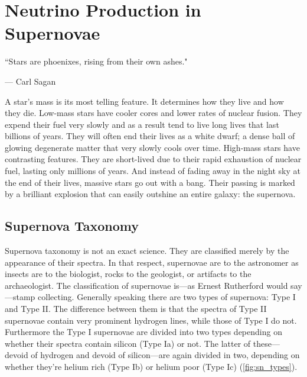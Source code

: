 %
%
%
%


\chapter{Neutrino Production in Supernovae}
	\label{supernovae_chapter}

	\vspace{-0.2in}

	\begin{quoting}
		\noindent \large ``Stars are phoenixes, rising from their own ashes." \normalsize

		--- Carl Sagan
	\end{quoting}

	 A star's mass is its most telling feature. It determines how they live and how they die. Low-mass stars have cooler cores and lower rates of nuclear fusion. They expend their fuel very slowly and as a result tend to live long lives that last billions of years. They will often end their lives as a white dwarf; a dense ball of glowing degenerate matter that very slowly cools over time. High-mass stars have contrasting features. They are short-lived due to their rapid exhaustion of nuclear fuel, lasting only millions of years. And instead of fading away in the night sky at the end of their lives, massive stars go out with a bang. Their passing is marked by a brilliant explosion that can easily outshine an entire galaxy: the supernova.
	
	\section{Supernova Taxonomy}
		Supernova taxonomy is not an exact science. They are classified merely by the appearance of their spectra. In that respect, supernovae are to the astronomer as insects are to the biologist, rocks to the geologist, or artifacts to the archaeologist. The classification of supernovae is---as Ernest Rutherford would say---stamp collecting. 
		Generally speaking there are two types of supernova: Type I and Type II. The difference between them is that the spectra of Type II supernovae contain very prominent hydrogen lines, while those of Type I do not. Furthermore the Type I supernovae are divided into two types depending on whether their spectra contain silicon (Type Ia) or not. The latter of these---devoid of hydrogen and devoid of silicon---are again divided in two, depending on whether they're helium rich (Type Ib) or helium poor (Type Ic) (\FIG \ref{fig:sn_types}).

